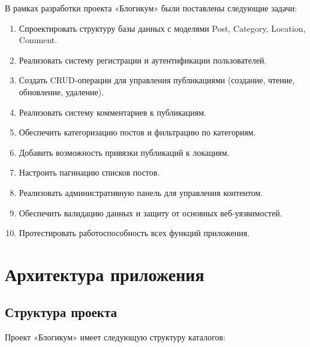 \documentclass[pract,och,bachelor]{SCWorks}
\begin{document}
В рамках разработки проекта «Блогикум» были поставлены следующие задачи:
\begin{enumerate}
    \item Спроектировать структуру базы данных с моделями Post, Category, Location, Comment.
    \item Реализовать систему регистрации и аутентификации пользователей.
    \item Создать CRUD-операции для управления публикациями (создание, чтение, обновление, удаление).
    \item Реализовать систему комментариев к публикациям.
    \item Обеспечить категоризацию постов и фильтрацию по категориям.
    \item Добавить возможность привязки публикаций к локациям.
    \item Настроить пагинацию списков постов.
    \item Реализовать административную панель для управления контентом.
    \item Обеспечить валидацию данных и защиту от основных веб-уязвимостей.
    \item Протестировать работоспособность всех функций приложения.
\end{enumerate}

\section{Архитектура приложения}

\subsection{Структура проекта}

Проект «Блогикум» имеет следующую структуру каталогов:
\end{document}
